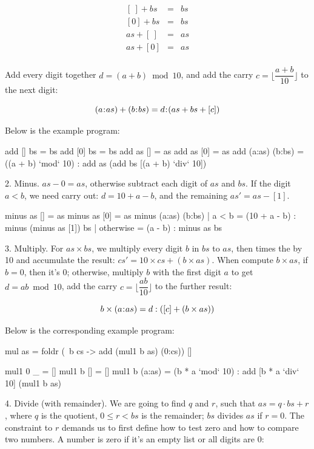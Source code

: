 \documentclass[b5paper]{article}
\begin{document}
\begin{Answer}[ref = {ex:list-others}]
{\[
\begin{array}{rcl}
\left[ \ \right] + bs & = & bs \\
\left[ 0 \right] + bs & = & bs \\
as + \left[\ \right] & = & as \\
as + \left[ 0 \right] & = & as \\
\end{array}
\]

Add every digit together $d = (a + b) \bmod 10$, and add the carry $c = \lfloor \dfrac{a + b}{10} \rfloor$ to the next digit:

\[
(a \mathbin{\!:\!} as) + (b \mathbin{\!:\!} bs) = d \mathbin{\!:\!} (as + bs + [c])
\]

Below is the example program:
\begin{Haskell}
add [] bs = bs
add [0] bs = bs
add as [] = as
add as [0] = as
add (a:as) (b:bs) = ((a + b) `mod` 10) : add as (add bs [(a + b) `div` 10])
\end{Haskell}

2. Minus. $as - 0 = as$, otherwise subtract each digit of $as$ and $bs$. If the digit $a < b$, we need carry out: $d = 10 + a - b$, and the remaining $as' = as - [1]$.

\begin{Haskell}
minus as [] = as
minus as [0] = as
minus (a:as) (b:bs) | a < b = (10 + a - b) : minus (minus as [1]) bs
                    | otherwise = (a - b) : minus as bs
\end{Haskell}

3. Multiply. For $as \times bs$, we multiply every digit $b$ in $bs$ to $as$, then times the by 10 and accumulate the result: $cs' = 10 \times cs + (b \times as)$. When compute $b \times as$, if $b = 0$, then it's $0$; otherwise, multiply $b$ with the first digit $a$ to get $d = ab \bmod 10$, add the carry $c = \lfloor \dfrac{ab}{10} \rfloor$ to the further result:

\[
b \times (a \mathbin{\!:\!} as) = d : ([c] + (b \times as))
\]

Below is the corresponding example program:

\begin{Haskell}
mul as = foldr (\ b cs -> add (mul1 b as) (0:cs)) []

mul1 0 _ = []
mul1 b [] = []
mul1 b (a:as) = (b * a `mod` 10) : add [b * a `div` 10] (mul1 b as)
\end{Haskell}

4. Divide (with remainder). We are going to find $q$ and $r$, such that $as = q \cdot bs + r$, where $q$ is the quotient, $0 \leq r < bs$ is the remainder; $bs$ divides $as$ if $r = 0$. The constraint to $r$ demands us to first define how to test zero and how to compare two numbers. A number is zero if it's an empty list or all digits are 0:

}
\end{Answer}
\end{document}

